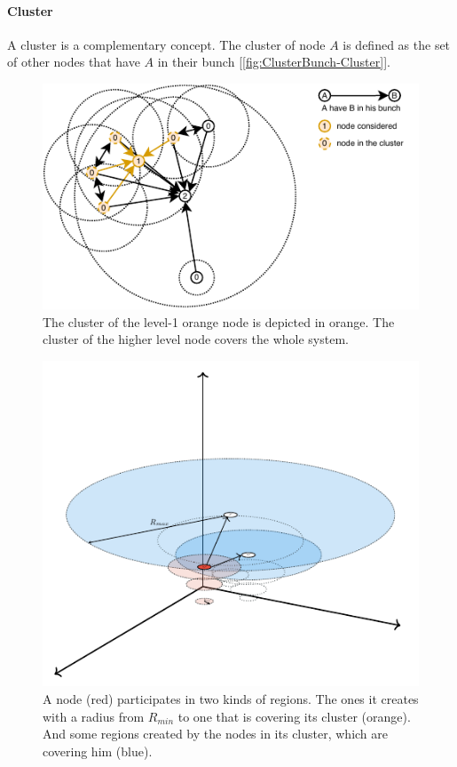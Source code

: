 \documentclass[a4paper,11pt,twoside,openright]{report}
\begin{document}
\paragraph{Cluster} A cluster is a complementary concept. The cluster of node
$A$ is defined as the set of other nodes that have $A$ in their bunch
[\autoref{fig:ClusterBunch-Cluster}]. 

\begin{figure}[!h] 
\centering
\includegraphics[width=350pt]{figures/ClusterBunch-Cluster}
\caption{ The cluster of the level-1 orange node is depicted in orange. The cluster of the
  higher level node covers the whole system. }
  \label{fig:ClusterBunch-Cluster}
\end{figure}

\begin{figure}[!h] 
\centering
\includegraphics[width=350pt]{figures/regions/ellipsis}
\caption{ A node (red) participates in two kinds of regions. The ones it creates with
  a radius from $R_{min}$ to one that is covering its cluster (orange). And
  some regions created by the nodes in its cluster, which are covering him
  (blue).} \label{fig:RegionCreation}
\end{figure}
\end{document}
